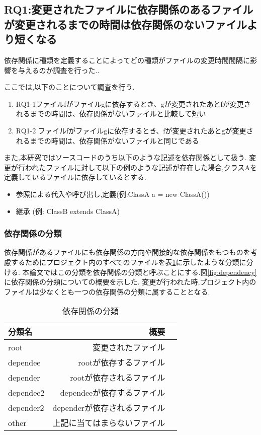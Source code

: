 \documentclass{fose2016}           %
\begin{document}
\subsection{RQ1:変更されたファイルに依存関係のあるファイルが変更されるまでの時間は依存関係のないファイルより短くなる}
依存関係に種類を定義することによってどの種類がファイルの変更時間間隔に影響を与えるのか調査を行った..

ここでは,以下のことについて調査を行う.
\begin{enumerate}
\item RQ1-1ファイルfがファイルgに依存するとき、gが変更されたあとfが変更されるまでの時間は、依存関係がないファイルと比較して短い
\item RQ1-2 ファイルfがファイルgに依存するとき、fが変更されたあとgが変更されるまでの時間は、依存関係がないファイルと同じである
\end{enumerate}

また,本研究ではソースコードのうち以下のような記述を依存関係として扱う.
変更が行われたファイルに対して以下の例のような記述が存在した場合,クラスAを定義しているファイルに依存しているとする.

\begin{itemize}
\item 参照による代入や呼び出し,定義(例:ClassA a = new ClassA())
\item 継承 (例: ClassB extends ClassA)
\end{itemize}

\subsubsection{依存関係の分類}
依存関係があるファイルにも依存関係の方向や間接的な依存関係をもつものを考慮するためにプロジェクト内のすべてのファイルを表\ref{tab:依存関係の分類}に示したような分類に分ける.
本論文ではこの分類を依存関係の分類と呼ぶことにする.図\ref{fig:dependency}に依存関係の分類についての概要を示した.
変更が行われた時,プロジェクト内のファイルは少なくとも一つの依存関係の分類に属することとなる.

\begin{table}
\caption{依存関係の分類}
\begin{tabular}{|l|r|r|} \hline
分類名 & 概要 \\ \hline
root & 変更されたファイル \\ \hline
dependee & rootが依存するファイル \\ \hline
depender & rootが依存されるファイル \\ \hline
dependee2 & dependeeが依存するファイル \\ \hline
depender2 & dependerが依存されるファイル \\ \hline
other & 上記に当てはまらないファイル \\ \hline
\end{tabular}
\label{tab:依存関係の分類}
\end{table}
\end{document}

